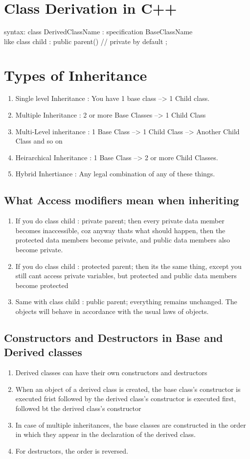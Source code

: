 \documentclass[11pt]{article}
\begin{document}
\section{Class Derivation in C++}
syntax: class DerivedClassName : specification BaseClassName\\
like class child : public parent() // private by default
{};

\section{Types of Inheritance}
{
	\begin{enumerate}
		\item Single level Inheritance : You have 1 base class --> 1 Child class.
		\item Multiple Inheritance : 2 or more Base Classes --> 1 Child Class
		\item Multi-Level inheritance : 1 Base Class --> 1 Child Class --> Another Child Class and so on
		\item Heirarchical Inheritance : 1 Base Class --> 2 or more Child Classes. 
		\item Hybrid Inhertiance : Any legal combination of any of these things. 
	\end{enumerate}
}

\subsection{What Access modifiers mean when inheriting}
\begin{enumerate}
	\item If you do class child : private parent; then every private data member becomes inaccessible, coz anyway thats what should happen, then the protected data members become private, and public data members also become private. 
	\item If you do class child : protected parent; then its the same thing, except you still cant access private variables, but protected and public data members become protected
	\item Same with class child : public parent; everything remains unchanged. The objects will behave in accordance with the usual laws of objects.  
\end{enumerate}


\subsection{Constructors and Destructors in Base and Derived classes}
\begin{enumerate}
	\item Derived classes can have their own constructors and destructors
	\item When an object of a derived class is created, the base class's constructor is executed frist followed by the derived class's constructor is executed first, followed bt the derived class's constructor
	\item In case of multiple inheritances, the base classes are constructed in the order in which they appear in the declaration of the derived class. 
	\item For destructors, the order is reversed. 
\end{enumerate}
\end{document}
